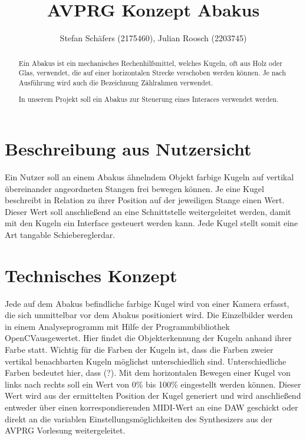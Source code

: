 \documentclass[12pt]{Article}
\title{AVPRG Konzept \glqq Abakus\grqq}
\author{ Stefan Schäfers (2175460), Julian Roosch (2203745)}
\begin{document}
\maketitle
\begin{abstract}
Ein Abakus ist ein mechanisches Rechenhilfsmittel, welches Kugeln, oft aus Holz oder Glas, verwendet, die auf einer horizontalen Strecke verschoben werden können. Je nach Ausführung wird auch die Bezeichnung Zählrahmen verwendet.

In unserem Projekt soll ein Abakus zur Steuerung eines Interaces verwendet werden.
\end{abstract}
\section{Beschreibung aus Nutzersicht}
Ein Nutzer soll an einem Abakus ähnelndem Objekt farbige Kugeln auf vertikal übereinander angeordneten Stangen frei bewegen können. Je eine Kugel beschreibt in Relation zu ihrer Position auf der jeweiligen Stange einen Wert. Dieser Wert soll anschließend an eine Schnittstelle weitergeleitet werden, damit mit den Kugeln ein Interface gesteuert werden kann. Jede Kugel stellt somit eine Art \glqq tangable Schieberegler\grqq dar.


\section{Technisches Konzept}
Jede auf dem Abakus befindliche farbige Kugel wird von einer Kamera erfasst, die sich unmittelbar vor dem Abakus positioniert wird. Die Einzelbilder werden in einem Analyseprogramm mit Hilfe der Programmbibliothek \glqq OpenCV\grqq ausgewertet. Hier findet die Objekterkennung der Kugeln anhand ihrer Farbe statt. Wichtig für die Farben der Kugeln ist, dass die Farben zweier vertikal benachbarten Kugeln möglichst unterschiedlich sind. Unterschiedliche Farben bedeutet hier, dass (?). Mit dem horizontalen Bewegen einer Kugel von links nach rechts soll ein Wert von 0\% bis 100\% eingestellt werden können. Dieser Wert wird aus der ermittelten Position der Kugel generiert und wird anschließend entweder über einen korrespondierenden MIDI-Wert an eine DAW geschickt oder direkt an die variablen Einstellungsmöglichkeiten des Synthesizers aus der AVPRG Vorlesung weitergeleitet.
\end{document}
